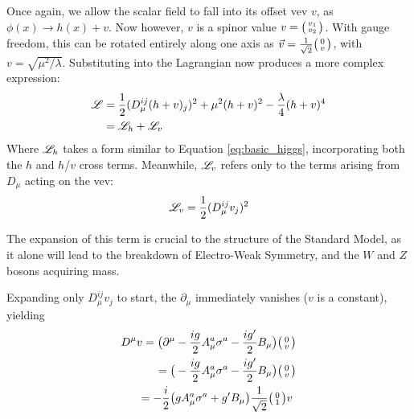         Once again, we allow the scalar field to fall into its offset vev $v$, as $\phi(x) \rightarrow h(x) + v$.
        Now however, $v$ is a spinor value $v = \big(\begin{smallmatrix} v_1 \\ v_2 \end{smallmatrix}\big)$.
        With gauge freedom, this can be rotated entirely along one axis as $\vec{v} = \frac{1}{\sqrt{2}}\big(\begin{smallmatrix} 0 \\ v \end{smallmatrix}\big)$,
            with $v = \sqrt{\mu^2/\lambda}$.
        Substituting into the Lagrangian now produces a more complex expression:
        \begin{equation} \begin{split}
            \label{eq:fullHiggs}
            \mathscr{L} & = \frac{1}{2} (D_{\mu}^{ij} (h+v)_j)^2
                + \mu^2 (h+v)^2
                - \frac{\lambda}{4} (h+v)^4 \\
             & = \mathscr{L}_h + \mathscr{L}_v
        \end{split} \end{equation}
        Where $\mathscr{L}_h$ takes a form similar to Equation \ref{eq:basic_higgs}, incorporating both the $h$ and $h$/$v$ cross terms.
        Meanwhile, $\mathscr{L}_v$ refers only to the terms arising from $D_{\mu}$ acting on the vev:
        \begin{equation}
            \label{eq:lagV}
            \mathscr{L}_v = \frac{1}{2} (D_{\mu}^{ij} v_j)^2
        \end{equation}

        The expansion of this term is crucial to the structure of the Standard Model,
            as it alone will lead to the breakdown of Electro-Weak Symmetry,
            and the $W$ and $Z$ bosons acquiring mass.

        Expanding only $D_{\mu}^{ij} v_j$ to start, the $\partial_{\mu}$ immediately vanishes ($v$ is a constant), yielding 
        \begin{equation} \begin{split}
            D^{\mu} v  = \big( \partial^{\mu} & - \frac{ig}{2} A^a_{\mu} \sigma^a - \frac{ig'}{2} B_{\mu} \big) \big(\begin{smallmatrix} 0\\v \end{smallmatrix}\big) \\
                = \big( & - \frac{ig}{2} A^a_{\mu} \sigma^a - \frac{ig'}{2} B_{\mu} \big) \big(\begin{smallmatrix} 0\\v \end{smallmatrix}\big) \\
                = - \frac{i}{2} \big( & g A^a_{\mu} \sigma^a + g' B_{\mu} \big) \frac{1}{\sqrt{2}}\big(\begin{smallmatrix} 0\\1 \end{smallmatrix}\big) v
        \end{split} \end{equation}

